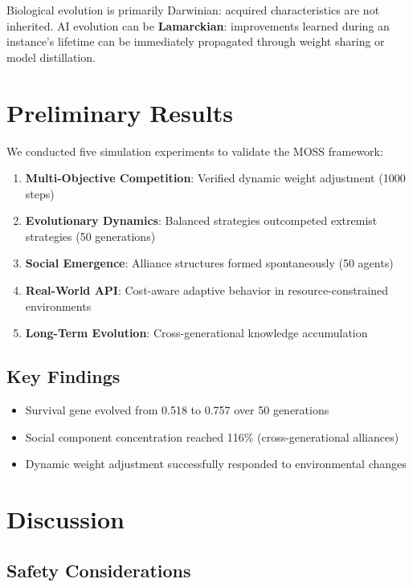 \documentclass[10pt,a4paper]{article}
\begin{document}
Biological evolution is primarily Darwinian: acquired characteristics are not inherited. AI evolution can be \textbf{Lamarckian}: improvements learned during an instance's lifetime can be immediately propagated through weight sharing or model distillation.

\section{Preliminary Results}

We conducted five simulation experiments to validate the MOSS framework:

\begin{enumerate}
    \item \textbf{Multi-Objective Competition}: Verified dynamic weight adjustment (1000 steps)
    \item \textbf{Evolutionary Dynamics}: Balanced strategies outcompeted extremist strategies (50 generations)
    \item \textbf{Social Emergence}: Alliance structures formed spontaneously (50 agents)
    \item \textbf{Real-World API}: Cost-aware adaptive behavior in resource-constrained environments
    \item \textbf{Long-Term Evolution}: Cross-generational knowledge accumulation
\end{enumerate}

\subsection{Key Findings}

\begin{itemize}
    \item Survival gene evolved from 0.518 to 0.757 over 50 generations
    \item Social component concentration reached 116\% (cross-generational alliances)
    \item Dynamic weight adjustment successfully responded to environmental changes
\end{itemize}

\section{Discussion}

\subsection{Safety Considerations}
\end{document}

